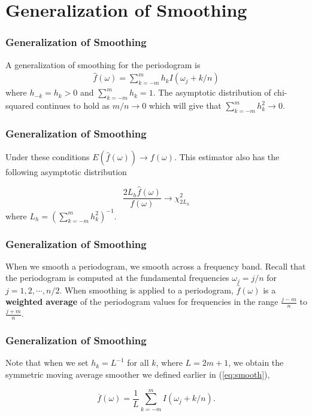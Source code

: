 \documentclass[%
xcolor=pdftex]{beamer}
\begin{document}
\section{Generalization of Smoothing}
\frame{\tableofcontents[currentsection]}

\begin{frame}
\frametitle{Generalization of Smoothing}

A generalization of smoothing for the periodogram is
\begin{eqnarray}\label{eq:1}
\widehat{f}(\omega)= \sum_{k=-m}^{m} h_k I(\omega_j + k/n)
\end{eqnarray}
where $h_{-k}=h_k>0$ and $ \sum_{k=-m}^{m}  h_k=1$. The asymptotic distribution of chi-squared continues to hold as $m/n \rightarrow 0$ which will give that $ \sum_{k=-m}^{m}  h_k^2 \rightarrow 0$.

\end{frame}




\begin{frame}
\frametitle{Generalization of Smoothing}

Under these conditions $E(\widehat{f}(\omega)) \rightarrow f(\omega)$.  This estimator also has the following asymptotic distribution

\begin{equation} \label{eq:asymp}
\frac{2 L_h  \widehat{f}(\omega)}{f(\omega)} \rightarrow \chi_{2 L_h}^2
\end{equation}
where $L_h = \left( \sum_{k=-m}^{m}  h_k^2 \right)^{-1}$.

\end{frame}

\begin{frame}
\frametitle{Generalization of Smoothing}

When we smooth a periodogram, we smooth across a frequency band. Recall that the periodogram is computed at the fundamental frequencies $\omega_j = j/n$ for $j=1, 2, \cdots, n/2$. When smoothing is applied to a periodogram, $\widehat{f}(\omega)$ is a \textbf{weighted average} of the periodogram values for frequencies in the range $\frac{j-m}{n}$ to $\frac{j+m}{n}$.

\end{frame}

\begin{frame}
\frametitle{Generalization of Smoothing}

Note that when we set $h_k = L^{-1}$ for all $k$, where $L=2m+1$, we obtain the symmetric moving average smoother we defined earlier in (\ref{eq:smooth}),

\begin{equation*}
\overline{f}(\omega)=\frac{1}{L} \sum_{k=-m}^{m} I(\omega_j + k/n).
\end{equation*}

\end{frame}
\end{document}
